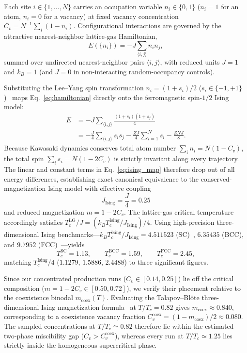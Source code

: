\documentclass[aps,pre,reprint,superscriptaddress,amsmath,amssymb,floatfix]{revtex4-2}
\begin{document}
Each site $i \in \{1,\dots,N\}$ carries an occupation variable $n_i \in \{0,1\}$ ($n_i = 1$ for an atom, $n_i = 0$ for a vacancy) at fixed vacancy concentration $C_v = N^{-1}\sum_i (1 - n_i)$. Configurational interactions are governed by the attractive nearest-neighbor lattice-gas Hamiltonian,
\begin{equation}
  E(\{n_i\}) = -J \sum_{\langle i,j \rangle} n_i n_j,
  \label{eq:hamiltonian}
\end{equation}
summed over undirected nearest-neighbor pairs $\langle i,j\rangle$, with reduced units $J = 1$ and $k_B = 1$ (and $J = 0$ in non-interacting random-occupancy controls).

Substituting the Lee--Yang spin transformation $n_i = (1 + s_i)/2$ ($s_i \in \{-1, +1\}$)~\cite{Lee1952,Yeomans1992} maps Eq.~\eqref{eq:hamiltonian} directly onto the ferromagnetic spin-$1/2$ Ising model:
\begin{align}
  E &= -J \sum_{\langle i,j \rangle} \frac{(1 + s_i)(1 + s_j)}{4} \nonumber \\
    &= -\frac{J}{4} \sum_{\langle i,j \rangle} s_i s_j - \frac{ZJ}{4} \sum_{i=1}^N s_i - \frac{ZNJ}{8}.
  \label{eq:ising_map}
\end{align}
Because Kawasaki dynamics conserves total atom number $\sum_i n_i = N(1 - C_v)$, the total spin $\sum_i s_i = N(1 - 2C_v)$ is strictly invariant along every trajectory. The linear and constant terms in Eq.~\eqref{eq:ising_map} therefore drop out of all energy differences, establishing exact canonical equivalence to the conserved-magnetization Ising model with effective coupling
\begin{equation}
  J_{\mathrm{Ising}} = \frac{J}{4} = 0.25
  \label{eq:j_ising}
\end{equation}
and reduced magnetization $m = 1 - 2C_v$. The lattice-gas critical temperature accordingly satisfies $T_c^{\mathrm{LG}}/J = (k_B T_c^{\mathrm{Ising}}/J_{\mathrm{Ising}})/4$. Using high-precision three-dimensional Ising benchmarks---$k_B T_c^{\mathrm{Ising}}/J_{\mathrm{Ising}} = 4.511523$ (SC)~\cite{Ferrenberg2018}, $6.35435$ (BCC), and $9.7952$ (FCC)~\cite{Lundow2009}---yields
\begin{equation}
  T_c^{\mathrm{SC}} = 1.13, \qquad T_c^{\mathrm{BCC}} = 1.59, \qquad T_c^{\mathrm{FCC}} = 2.45,
  \label{eq:tc_values}
\end{equation}
matching $T_c^{\mathrm{Ising}}/4$ ($1.1279$, $1.5886$, $2.4488$) to three significant figures.

Since our concentrated production runs ($C_v \in [0.14, 0.25]$) lie off the critical composition ($m = 1 - 2C_v \in [0.50, 0.72]$), we verify their placement relative to the coexistence binodal $m_{\mathrm{coex}}(T)$. Evaluating the Talapov--Bl\"ote three-dimensional Ising magnetization formula~\cite{Talapov1996} at $T/T_c = 0.82$ gives $m_{\mathrm{coex}} \approx 0.840$, corresponding to a coexistence vacancy fraction $C_v^{\mathrm{coex}} = (1 - m_{\mathrm{coex}})/2 \approx 0.080$. The sampled concentrations at $T/T_c \simeq 0.82$ therefore lie within the estimated two-phase miscibility gap ($C_v > C_v^{\mathrm{coex}}$), whereas every run at $T/T_c \simeq 1.25$ lies strictly inside the homogeneous supercritical phase.
\end{document}
